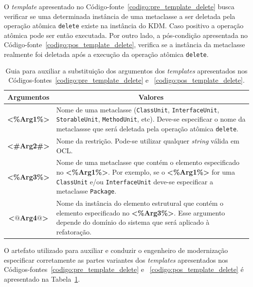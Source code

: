 O \textit{template} apresentado no Código-fonte~\ref{codigo:pre_template_delete} busca verificar se uma determinada instância de uma metaclasse a ser deletada pela operação atômica \texttt{delete} existe na instância do KDM. Caso positivo a operação atômica pode ser então executada. Por outro lado, a pós-condição apresentada no Código-fonte~\ref{codigo:pos_template_delete}, verifica se a instância da metaclasse realmente foi deletada após a execução da operação atômica \texttt{delete}. 

\begin{table}[h]
\centering
\caption{Guia para auxiliar a substituição dos argumentos dos \textit{templates} apresentados nos Códigos-fontes~\ref{codigo:pre_template_delete} e ~\ref{codigo:pos_template_delete}.}
\label{tab:guia_template_pre_pos_delete}
\begin{tabular}{ | m{1.7cm} | m{12cm}| } 
\hline
\multicolumn{1}{|c|}{Argumentos}                                         & \multicolumn{1}{c|}{Valores} \\ \hline
\multicolumn{1}{|c|}{\textbf{<\%Arg1\%>}} & Nome de uma metaclasse (\texttt{ClassUnit}, \texttt{InterfaceUnit}, \texttt{StorableUnit}, \texttt{MethodUnit}, etc). Deve-se especificar o nome da metaclassse que será deletada pela operação atômica \texttt{delete}. \\ 
\hline
\multicolumn{1}{|c|}{\textbf{<\#Arg2\#>}} & Nome da restrição. Pode-se utilizar qualquer \textit{string} válida em OCL. \\ 
\hline
\multicolumn{1}{|c|}{\textbf{<\%Arg3\%>}} & Nome de uma metaclasse que contém o elemento especificado no \textbf{<\%Arg1\%>}. Por exemplo, se o \textbf{<\%Arg1\%>} for uma \texttt{ClassUnit} e/ou \texttt{InterfaceUnit} deve-se especificar a metaclasse \texttt{Package}. \\ 
\hline
\multicolumn{1}{|c|}{\textbf{<$@$Arg4$@$>}} & Nome da instância do elemento estrutural que contém o elemento especificado no \textbf{<\%Arg3\%>}. Esse argumento depende do domínio do sistema que será aplicado à refatoração. \\ 
\hline
\end{tabular}
\end{table}

O artefato utilizado para auxiliar e conduzir o engenheiro de modernização especificar corretamente as partes variantes dos \textit{templates} apresentados nos Códigos-fontes~\ref{codigo:pre_template_delete} e ~\ref{codigo:pos_template_delete} é apresentado na Tabela~\ref{tab:guia_template_pre_pos_delete}. 

